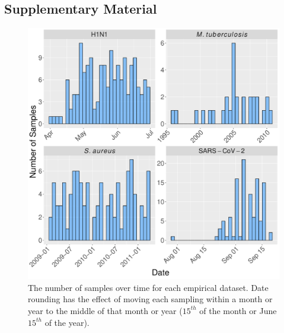 \documentclass[11pt]{article}
\begin{document}
\subsection*{Supplementary Material}

\renewcommand{\thefigure}{S\arabic{figure}}
\renewcommand{\thetable}{S\arabic{table}}
\setcounter{figure}{0}
\setcounter{table}{0}

\begin{figure}[H]
    \centering
    \includegraphics[width=\textwidth]{figures/empirical_sampling_times.pdf}
    \caption{The number of samples over time for each empirical dataset. Date rounding has the effect of moving each sampling within a month or year to the middle of that month or year ($15^{th}$ of the month or June $15^{th}$ of the year).}
    \label{fig:sampling}
\end{figure}
\end{document}
